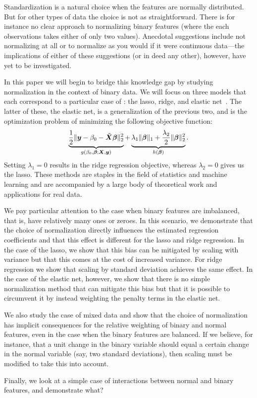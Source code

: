 Standardization is a natural choice when the features are normally distributed. But for
other types of data the choice is not as straightforward. There is for instance no clear
approach to normalizing binary features (where the each observations takes either of only
two values). Anecdotal suggestions include not normalizing at all or to normalize as you
would if it were continuous data---the implications of either of these suggestions (or in
deed any other), however, have yet to be investigated.

In this paper we will begin to bridge this knowledge gap by studying normalization in the
context of binary data. We will focus on three models that each correspond to a particular
case of : the lasso, ridge, and elastic net~\citep{zou2005}. The
latter of these, the elastic net, is a generalization of the previous two, and is the
optimization problem of minimizing the following objective function:
\begin{equation*}
  \underbrace{\frac{1}{2} \lVert \boldsymbol y - \beta_0 - \tilde{\boldsymbol{X}}\boldsymbol{\beta} \rVert^2_2}_{g(\beta_0, \boldsymbol{\beta}; \boldsymbol{X}, \boldsymbol{y})}  + \underbrace{\lambda_1 \lVert \boldsymbol\beta \rVert_1 + \frac{\lambda_2}{2}\lVert \boldsymbol \beta \rVert_2^2}_{h(\boldsymbol{\beta})}.
\end{equation*}
%
Setting \(\lambda_1 = 0\) results in the ridge regression objective, whereas \(\lambda_2 =
0\) gives us the lasso. These methods are staples in the field of statistics and machine
learning and are accompanied by a large body of theoretical work and applications for real
data.

We pay particular attention to the case when binary features are imbalanced, that is, have
relatively many ones or zeroes. In this scenario, we demonstrate that the choice of
normalization directly influences the estimated regression coefficients and that this
effect is different for the lasso and ridge regression. In the case of the lasso, we show
that this bias can be mitigated by scaling with variance but that this comes at the cost of
increased variance. For ridge regression we show that scaling by standard deviation
achieves the same effect. In the case of the elastic net, however, we show that there is no
simple normalization method that can mitigate this bias but that it is possible to
circumvent it by instead weighting the penalty terms in the elastic net.

We also study the case of mixed data and show that the choice of normalization has implicit
consequences for the relative weighting of binary and normal features, even in the case
when the binary features are balanced. If we believe, for instance, that a unit change in
the binary variable should equal a certain change in the normal variable (say, two standard
deviations), then scaling must be modified to take this into account.

Finally, we look at a simple case of interactions between normal and binary features, and
demonstrate what?

